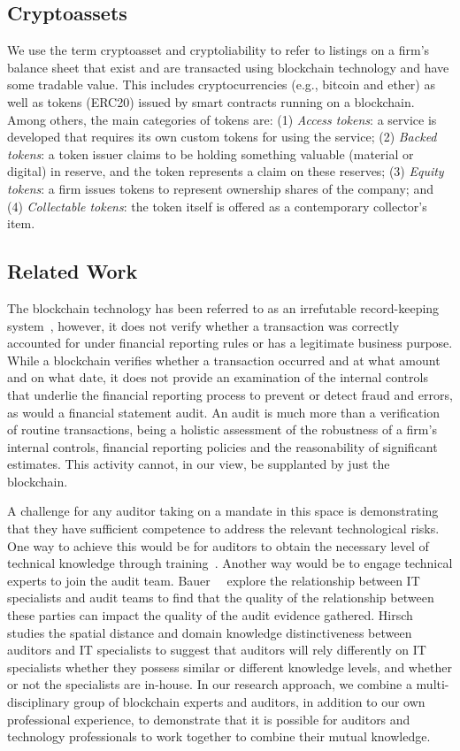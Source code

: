 \subsection{Cryptoassets}
We use the term cryptoasset and cryptoliability to refer to listings on a firm's balance sheet that exist and are transacted using blockchain technology and have some tradable value. This includes cryptocurrencies (e.g., bitcoin and ether) as well as tokens (\eg ERC20) issued by smart contracts running on a blockchain. Among others, the main categories of tokens are: (1) \textit{Access tokens}: a service is developed that requires its own custom tokens for using the service; (2) \textit{Backed tokens}: a token issuer claims to be holding something valuable (material or digital) in reserve, and the token represents a claim on these reserves; (3) \textit{Equity tokens}: a firm issues tokens to represent ownership shares of the company; and (4) \textit{Collectable tokens}: the token itself is offered as a contemporary collector's item. 


\subsection{Related Work}
The blockchain technology has been referred to as an irrefutable record-keeping system~\cite{crosby2016blockchain}, however, it does not verify whether a transaction was correctly accounted for under financial reporting rules or has a legitimate business purpose. While a blockchain verifies whether a transaction occurred and at what amount and on what date, it does not provide an examination of the internal controls that underlie the financial reporting process to prevent or detect fraud and errors, as would a financial statement audit. An audit is much more than a verification of routine transactions, being a holistic assessment of the robustness of a firm's internal controls, financial reporting policies and the reasonability of significant estimates. This activity cannot, in our view, be supplanted by just the blockchain.

A challenge for any auditor taking on a mandate in this space is demonstrating that they have sufficient competence to address the relevant technological risks. One way to achieve this would be for auditors to obtain the necessary level of technical knowledge through training~\cite{curtis2009auditors}. Another way would be to engage technical experts to join the audit team. Bauer~\etal~\cite{bauer2019one} explore the relationship between IT specialists and audit teams to find that the quality of the relationship between these parties can impact the quality of the audit evidence gathered. Hirsch~\cite{hirsch2020effect} studies the spatial distance and domain knowledge distinctiveness between auditors and IT specialists to suggest that auditors will rely differently on IT specialists whether they possess similar or different knowledge levels, and whether or not the specialists are in-house. In our research approach, we combine a multi-disciplinary group of blockchain experts and auditors, in addition to our own professional experience, to demonstrate that it is possible for auditors and technology professionals to work together to combine their mutual knowledge.

